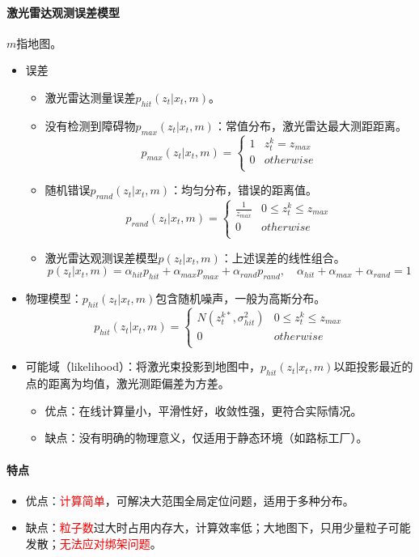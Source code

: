 \documentclass[
12pt, %
a4paper, 
oneside, %
]{scrartcl}
\begin{document}
\paragraph{激光雷达观测误差模型}
$ m $指地图。
\begin{itemize}
\item 误差
\begin{itemize}
\item 激光雷达测量误差$ p_{hit}(z_t|x_t, m) $。
\item 没有检测到障碍物$ p_{max}(z_t|x_t, m) $：常值分布，激光雷达最大测距距离。
$$ p_{max}(z_t|x_t, m) = \begin{cases} 1 & z_t^k = z_{max} \\ 0 & otherwise \\ \end{cases} $$
\item 随机错误$ p_{rand}(z_t|x_t, m) $：均匀分布，错误的距离值。
$$ p_{rand}(z_t|x_t, m) = \begin{cases} \frac{1}{z_{max}} & 0 \leq z_t^k \leq z_{max} \\ 0 & otherwise \\ \end{cases} $$
\item 激光雷达观测误差模型$ p(z_t|x_t, m) $：上述误差的线性组合。
$$ p(z_t|x_t, m) = \alpha_{hit}p_{hit} + \alpha_{max}p_{max} + \alpha_{rand}p_{rand}, \quad \alpha_{hit} + \alpha_{max} + \alpha_{rand} = 1 $$
\end{itemize}
\item 物理模型：$ p_{hit}(z_t|x_t, m) $包含随机噪声，一般为高斯分布。
$$ p_{hit}(z_t|x_t, m) = \begin{cases} N(z_t^{k*}, \sigma_{hit}^2) & 0 \leq z_t^k \leq z_{max} \\ 0 & otherwise \\ \end{cases} $$
\item 可能域（likelihood）：将激光束投影到地图中，$ p_{hit}(z_t|x_t, m) $以距投影最近的点的距离为均值，激光测距偏差为方差。
\begin{itemize}
\item 优点：在线计算量小，平滑性好，收敛性强，更符合实际情况。
\item 缺点：没有明确的物理意义，仅适用于静态环境（如路标工厂）。
\end{itemize}
\end{itemize}
\paragraph{特点}
\begin{itemize}
\item 优点：\textcolor{red}{计算简单}，可解决大范围全局定位问题，适用于多种分布。
\item 缺点：\textcolor{red}{粒子数}过大时占用内存大，计算效率低；大地图下，只用少量粒子可能发散；\textcolor{red}{无法应对绑架问题}。
\end{itemize}
\end{document}
